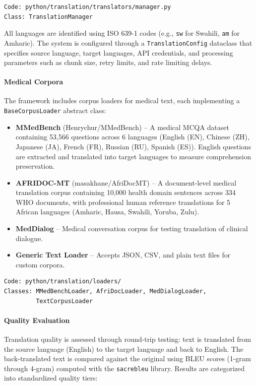 \begin{verbatim}
Code: python/translation/translators/manager.py
Class: TranslationManager
\end{verbatim}

All languages are identified using ISO 639-1 codes (e.g., \texttt{sw} for Swahili, \texttt{am} for Amharic). The system is configured through a \texttt{TranslationConfig} dataclass that specifies source language, target languages, API credentials, and processing parameters such as chunk size, retry limits, and rate limiting delays.

\paragraph{Medical Corpora}
The framework includes corpus loaders for medical text, each implementing a \texttt{BaseCorpusLoader} abstract class:
\begin{itemize}
\item \textbf{MMedBench} (Henrychur/MMedBench) -- A medical MCQA dataset containing 53,566 questions across 6 languages (English (EN), Chinese (ZH), Japanese (JA), French (FR), Russian (RU), Spanish (ES)). English questions are extracted and translated into target languages to measure comprehension preservation.
\item \textbf{AFRIDOC-MT} (masakhane/AfriDocMT) -- A document-level medical translation corpus containing 10,000 health domain sentences across 334 WHO documents, with professional human reference translations for 5 African languages (Amharic, Hausa, Swahili, Yoruba, Zulu).
\item \textbf{MedDialog} -- Medical conversation corpus for testing translation of clinical dialogue.
\item \textbf{Generic Text Loader} -- Accepts JSON, CSV, and plain text files for custom corpora.
\end{itemize}

\begin{verbatim}
Code: python/translation/loaders/
Classes: MMedBenchLoader, AfriDocLoader, MedDialogLoader,
         TextCorpusLoader
\end{verbatim}

\paragraph{Quality Evaluation}
Translation quality is assessed through round-trip testing: text is translated from the source language (English) to the target language and back to English. The back-translated text is compared against the original using BLEU scores (1-gram through 4-gram) computed with the \texttt{sacrebleu} library. Results are categorized into standardized quality tiers:


